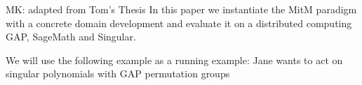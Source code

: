 \begin{newpart}{MK: adapted from Tom's Thesis}
In this paper we instantiate the MitM paradigm with a concrete domain development and
evaluate it on a distributed computing GAP, SageMath and Singular.

We will use the following example as a running example: Jane wants to act on singular
polynomials with GAP permutation groups

\end{newpart}

